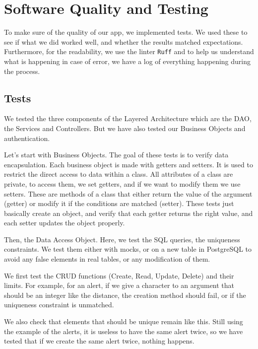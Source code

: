 \section{Software Quality and Testing}

\bigskip

To make sure of the quality of our app, we implemented tests. We used these to see if what we did worked well, and whether the results matched expectations. Furthermore, for the readability, we use the linter \texttt{Ruff} and to help us understand what is happening in case of error, we have a log of everything happening during the process.

\subsection{Tests}

We tested the three components of the Layered Architecture which are the DAO, the Services and Controllers. But we have also tested our Business Objects and authentication.

\bigskip

Let's start with Business Objects. The goal of these tests is to verify data encapsulation. Each business object is made with getters and setters. It is used to restrict the direct access to data within a class. All attributes of a class are private, to access them, we set getters, and if we want to modify them we use setters. These are methods of a class that either return the value of the argument (getter) or modify it if the conditions are matched (setter).
These tests just basically create an object, and verify that each getter returns the right value, and each setter updates the object properly.

\bigskip

Then, the Data Access Object. Here, we test the SQL queries, the uniqueness constraints. We test them either with mocks, or on a new table in PostgreSQL to avoid any false elements in real tables, or any modification of them.

\medskip

We first test the CRUD functions (Create, Read, Update, Delete) and their limits. For example, for an alert, if we give a character to an argument that should be an integer like the distance, the creation method should fail, or if the uniqueness constraint is unmatched.

\medskip

We also check that elements that should be unique remain like this. Still using the example of the alerts, it is useless to have the same alert twice, so we have tested that if we create the same alert twice, nothing happens.

